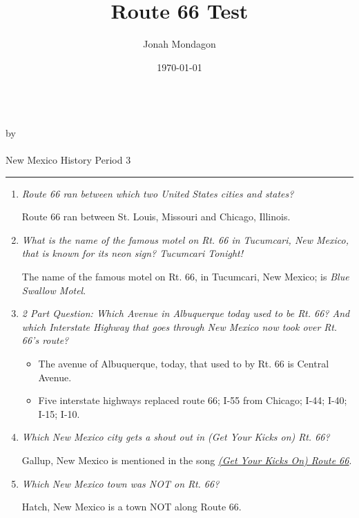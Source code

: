 \documentclass[12pt]{article}
\newcommand{\PutTitle}[1]
{
    \begin{center}
        {\huge\bfseries\thetitle}\\
        by \theauthor\\
        \thedate\\
        #1
    \end{center}
    \hrule
}
\begin{document}
\title{Route 66 Test}
\author{Jonah Mondagon}
\date{\today}
\PutTitle{New Mexico History Period 3}

\pagestyle{headings}

\doublespacing

\begin{enumerate}
    \item{\textit{Route 66 ran between which two United States cities and states?}}
        \begin{addmargin}[24pt]{0in}
            Route 66 ran between St. Louis, Missouri and Chicago, Illinois.
        \end{addmargin}
    \item{\textit{What is the name of the famous motel on Rt. 66 in Tucumcari, New Mexico, that is known for its neon sign? Tucumcari Tonight!}}
        \begin{addmargin}[24pt]{0in}
            The name of the famous motel on Rt. 66, in Tucumcari, New Mexico; is \textit{Blue Swallow Motel}.
        \end{addmargin}
    \item{\textit{2 Part Question: Which Avenue in Albuquerque today used to be Rt. 66? And which Interstate Highway that goes through New Mexico now took over Rt. 66's route?}}
        \begin{addmargin}[24pt]{0in}
            \begin{itemize}
                \item{The avenue of Albuquerque, today, that used to by Rt. 66 is Central Avenue.}
                \item{Five interstate highways replaced route 66; I-55 from Chicago; I-44; I-40; I-15; I-10.}
            \end{itemize}
        \end{addmargin}
    \item{\textit{Which New Mexico city gets a shout out in (Get Your Kicks on) Rt. 66?}}
        \begin{addmargin}[24pt]{0in}
            Gallup, New Mexico is mentioned in the song {\color{blue}\underline{\href{https://www.youtube.com/watch?v=9nuDE1SJlPo}{\textit{(Get Your Kicks On) Route 66}}}}.
        \end{addmargin}
    \item{\textit{Which New Mexico town was NOT on Rt. 66?}}
        \begin{addmargin}[24pt]{0in}
            Hatch, New Mexico is a town NOT along Route 66.
        \end{addmargin}

\end{enumerate}
\end{document}
